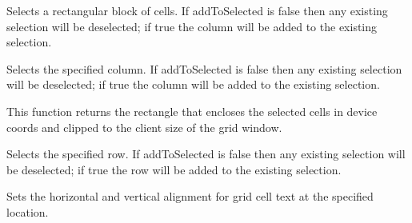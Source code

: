 \label{wxgridselectblock}



Selects a rectangular block of cells. If addToSelected is false then any existing selection will be
deselected; if true the column will be added to the existing selection.



\label{wxgridselectcol}


Selects the specified column. If addToSelected is false then any existing selection will be
deselected; if true the column will be added to the existing selection.



\label{wxgridselectiontodevicerect}


This function returns the rectangle that encloses the selected cells
in device coords and clipped to the client size of the grid window.



\label{wxgridselectrow}


Selects the specified row. If addToSelected is false then any existing selection will be
deselected; if true the row will be added to the existing selection.



\label{wxgridsetcellalignment}



Sets the horizontal and vertical alignment for grid cell text at the specified location.

